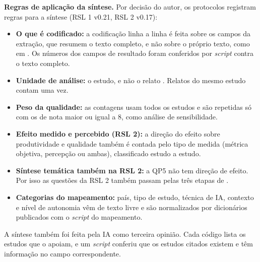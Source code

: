 \textbf{Regras de aplicação da síntese.} Por decisão do autor, os protocolos
registram regras para a síntese (RSL 1 v0.21, RSL 2 v0.17):
\begin{itemize}
	\item \textbf{O que é codificado:} a codificação linha a linha é feita
	sobre os campos da extração, que resumem o texto completo, e não sobre o
	próprio texto, como em . Os números dos campos de
	resultado foram conferidos por \textit{script} contra o texto completo.
	\item \textbf{Unidade de análise:} o estudo, e não o relato
	\cite[quadro 1]{page2021ee}. Relatos do mesmo estudo contam uma vez.
	\item \textbf{Peso da qualidade:} as contagens usam todos os estudos e
	são repetidas só com os de nota maior ou igual a 8, como análise de
	sensibilidade.
	\item \textbf{Efeito medido e percebido (RSL 2):} a direção do efeito
	sobre produtividade e qualidade também é contada pelo tipo de medida
	(métrica objetiva, percepção ou ambas), classificado estudo a estudo.
	\item \textbf{Síntese temática também na RSL 2:} a QP5 não tem direção de
	efeito. Por isso as questões da RSL 2 também passam pelas três etapas de
	.
	\item \textbf{Categorias do mapeamento:} país, tipo de estudo, técnica de
	IA, contexto e nível de autonomia vêm de texto livre e são normalizados
	por dicionários publicados com o \textit{script} do mapeamento.
\end{itemize}
A síntese também foi feita pela IA como terceira opinião. Cada código lista
os estudos que o apoiam, e um \textit{script} conferiu que os estudos citados
existem e têm informação no campo correspondente.
